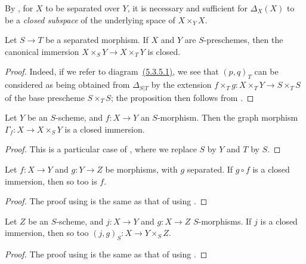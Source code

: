 By , for $X$ to be separated over $Y$, it is necessary and sufficient for $\Delta_X(X)$ to be a \emph{closed subspace} of the underlying space of $X\times_Y X$.

\begin{prop}[5.4.2]
\label{1.5.4.2}
Let $S\to T$ be a separated morphism.
If $X$ and $Y$ are $S$-preschemes, then the canonical immersion $X\times_S Y\to X\times_T Y$  is closed.
\end{prop}

\begin{proof}
\label{proof-1.5.4.2}
Indeed, if we refer to diagram~\hyperref[1.5.3.5]{(5.3.5.1)}, we see that $(p,q)_T$ can be considered as being obtained from $\Delta_{S|T}$ by the extension $f\times_T g:X\times_T Y\to S\times_T S$ of the base prescheme $S\times_T S$;
the proposition then follows from .
\end{proof}

\begin{cor}[5.4.3]
\label{1.5.4.3}
Let $Y$ be an $S$-scheme, and $f:X\to Y$ an $S$-morphism.
Then the graph morphism $\Gamma_f:X\to X\times_S Y$  is a closed immersion.
\end{cor}

\begin{proof}
\label{proof-1.5.4.3}
This is a particular case of , where we replace $S$ by $Y$ and $T$ by $S$.
\end{proof}

\begin{cor}[5.4.4]
\label{1.5.4.4}
Let $f:X\to Y$ and $g:Y\to Z$ be morphisms, with $g$ separated.
If $g\circ f$ is a closed immersion, then so too is $f$.
\end{cor}

\begin{proof}
\label{proof-1.5.4.4}
The proof using  is the same as that of  using .
\end{proof}

\begin{cor}[5.4.5]
\label{1.5.4.5}
Let $Z$ be an $S$-scheme, and $j:X\to Y$ and $g:X\to Z$ $S$-morphisms.
If $j$ is a closed immersion, then so too $(j,g)_S:X\to Y\times_S Z$.
\end{cor}

\begin{proof}
\label{proof-1.5.4.5}
The proof using  is the same as that of  using .
\end{proof}

